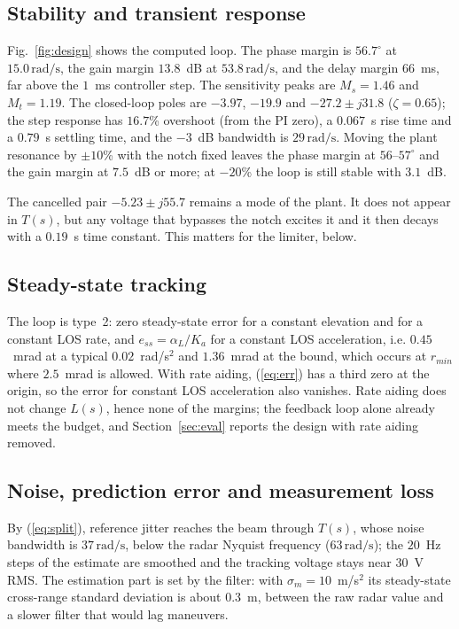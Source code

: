 \documentclass[conference]{IEEEtran}
\newcommand{\sm}{\sigma_m}
\newcommand{\rads}{\,\mathrm{rad/s}}
\begin{document}
\subsection{Stability and transient response}
Fig.~\ref{fig:design} shows the computed loop. The phase margin is $56.7^\circ$ at $15.0\rads$, the gain margin $13.8$~dB at $53.8\rads$, and the delay margin $66$~ms, far above the $1$~ms controller step. The sensitivity peaks are $M_s=1.46$ and $M_t=1.19$. The closed-loop poles are $-3.97$, $-19.9$ and $-27.2\pm j31.8$ ($\zeta=0.65$); the step response has $16.7$\% overshoot (from the PI zero), a $0.067$~s rise time and a $0.79$~s settling time, and the $-3$~dB bandwidth is $29\rads$. Moving the plant resonance by $\pm10$\% with the notch fixed leaves the phase margin at $56$--$57^\circ$ and the gain margin at $7.5$~dB or more; at $-20$\% the loop is still stable with $3.1$~dB.

The cancelled pair $-5.23\pm j55.7$ remains a mode of the plant. It does not appear in $T(s)$, but any voltage that bypasses the notch excites it and it then decays with a $0.19$~s time constant. This matters for the limiter, below.

\subsection{Steady-state tracking}
The loop is type~2: zero steady-state error for a constant elevation and for a constant LOS rate, and $e_{ss}=\alpha_L/K_a$ for a constant LOS acceleration, i.e. $0.45$~mrad at a typical $0.02$~rad/s$^2$ and $1.36$~mrad at the bound, which occurs at $r_{min}$ where $2.5$~mrad is allowed. With rate aiding, (\ref{eq:err}) has a third zero at the origin, so the error for constant LOS acceleration also vanishes. Rate aiding does not change $L(s)$, hence none of the margins; the feedback loop alone already meets the budget, and Section~\ref{sec:eval} reports the design with rate aiding removed.

\subsection{Noise, prediction error and measurement loss}
By (\ref{eq:split}), reference jitter reaches the beam through $T(s)$, whose noise bandwidth is $37\rads$, below the radar Nyquist frequency ($63\rads$); the $20$~Hz steps of the estimate are smoothed and the tracking voltage stays near $30$~V RMS. The estimation part is set by the filter: with $\sm=10$~m/s$^2$ its steady-state cross-range standard deviation is about $0.3$~m, between the raw radar value and a slower filter that would lag maneuvers.
\end{document}
